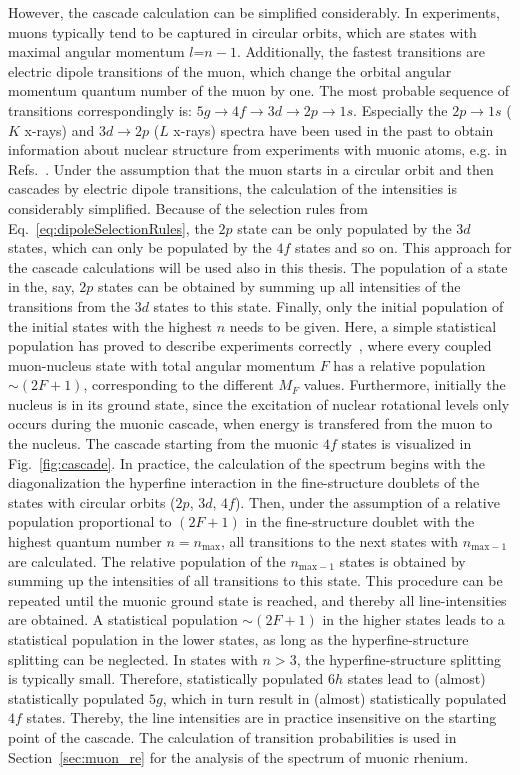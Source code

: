 However, the cascade calculation can be simplified considerably. In experiments, muons typically tend to be captured in circular orbits, which are states with maximal angular momentum $l$=$n-1$. Additionally, the fastest transitions are electric dipole transitions of the muon, which change the orbital angular momentum quantum number of the muon by one. The most probable sequence of transitions correspondingly is: $5g\rightarrow 4f \rightarrow 3d \rightarrow 2p \rightarrow 1s$. Especially the $2p\rightarrow 1s$ ($K$ x-rays) and $3d\rightarrow 2p$ ($L$ x-rays) spectra have been used in the past to obtain information about nuclear structure from experiments with muonic atoms, e.g. in Refs.~\cite{tanaka1983,tanaka1984,tanaka1984_2,hitlin1970,Dey1979,dewit1966,Bergem1988}. Under the assumption that the muon starts in a circular orbit and then cascades by electric dipole transitions, the calculation of the intensities is considerably simplified. Because of the selection rules from Eq.~\eqref{eq:dipoleSelectionRules}, the $2p$ state can be only populated by the $3d$ states, which can only be populated by the $4f$ states and so on. This approach for the cascade calculations will be used also in this thesis. The population of a state in the, say, $2p$ states can be obtained by summing up all intensities of the transitions from the $3d$ states to this state. Finally, only the initial population of the initial states with the highest $n$ needs to be given. Here, a simple statistical population has proved to describe experiments correctly~\cite{Dey1979}, where every coupled muon-nucleus state with total angular momentum $F$ has a relative population $\sim (2F+1)$, corresponding to the different $M_F$ values. Furthermore, initially the nucleus is in its ground state, since the excitation of nuclear rotational levels only occurs during the muonic cascade, when energy is transfered from the muon to the nucleus.
The cascade starting from the muonic $4f$ states is visualized in Fig.~\ref{fig:cascade}. In practice, the calculation of the spectrum begins with the diagonalization the hyperfine interaction in the fine-structure doublets of the states with circular orbits ($2p$, $3d$, $4f$). Then, under the assumption of a relative population proportional to $(2F+1)$ in the fine-structure doublet with the highest quantum number $n=n_{\text{max}}$, all transitions to the next states with $n_{\text{max}-1}$ are calculated. The relative population of the $n_{\text{max}-1}$ states is obtained by summing up the intensities of all transitions to this state. This procedure can be repeated until the muonic ground state is reached, and thereby all line-intensities are obtained. A statistical population $\sim (2F+1)$ in the higher states leads to a statistical population in the lower states, as long as the hyperfine-structure  splitting can be neglected. In states with $n>3$, the hyperfine-structure splitting is typically small. Therefore, statistically populated $6h$ states lead to (almost) statistically populated $5g$, which in turn result in (almost) statistically populated $4f$ states. Thereby, the line intensities are in practice insensitive on the starting point of the cascade. The calculation of transition probabilities is used in Section~\ref{sec:muon_re} for the analysis of the spectrum of muonic rhenium.

